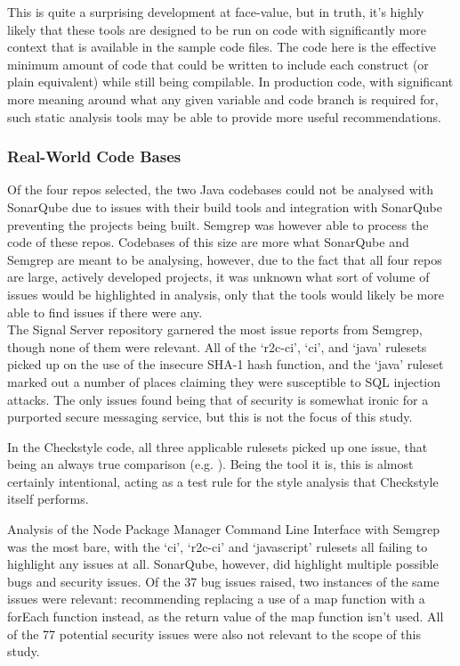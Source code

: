 \documentclass{article}
\begin{document}
            This is quite a surprising development at face-value, but in truth, it's highly likely that these tools are designed to be run on code with significantly more context that is available in the sample code files. The code here is the effective minimum amount of code that could be written to include each construct (or plain equivalent) while still being compilable. In production code, with significant more meaning around what any given variable and code branch is required for, such static analysis tools may be able to provide more useful recommendations.

        \subsubsection{Real-World Code Bases}
        \label{subsubsec:staticAnalysisRepos}
            Of the four repos selected, the two Java codebases could not be analysed with SonarQube due to issues with their build tools and integration with SonarQube preventing the projects being built. Semgrep was however able to process the code of these repos. Codebases of this size are more what SonarQube and Semgrep are meant to be analysing, however, due to the fact that all four repos are large, actively developed projects, it was unknown what sort of volume of issues would be highlighted in analysis, only that the tools would likely be more able to find issues if there were any.
            \\

            The Signal Server repository garnered the most issue reports from Semgrep, though none of them were relevant. All of the `r2c-ci', `ci', and `java' rulesets picked up on the use of the insecure SHA-1 hash function, and the `java' ruleset marked out a number of places claiming they were susceptible to SQL injection attacks. The only issues found being that of security is somewhat ironic for a purported secure messaging service, but this is not the focus of this study.

            In the Checkstyle code, all three applicable rulesets picked up one issue, that being an always true comparison (e.g. ). Being the tool it is, this is almost certainly intentional, acting as a test rule for the style analysis that Checkstyle itself performs.

            Analysis of the Node Package Manager Command Line Interface with Semgrep was the most bare, with the `ci', `r2c-ci' and `javascript' rulesets all failing to highlight any issues at all. SonarQube, however, did highlight multiple possible bugs and security issues. Of the 37 bug issues raised, two instances of the same issues were relevant: recommending replacing a use of a map function with a forEach function instead, as the return value of the map function isn't used. All of the 77 potential security issues were also not relevant to the scope of this study.
\end{document}
